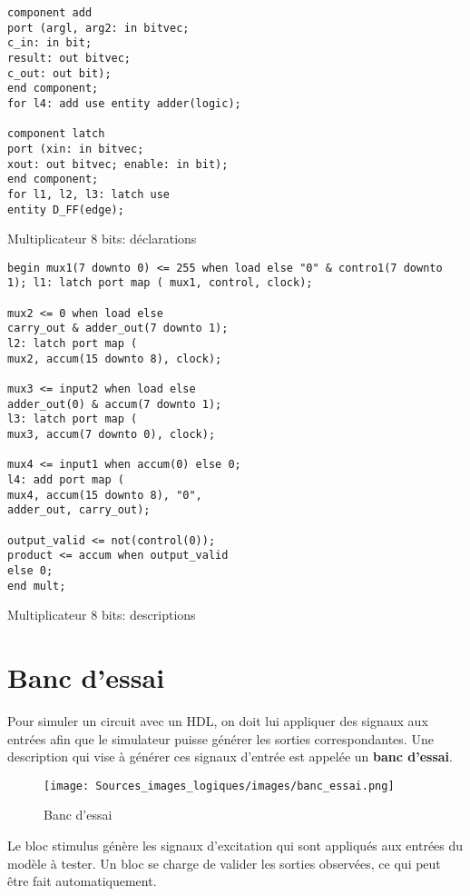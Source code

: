 \documentclass[letter, oneside]{book}
\begin{document}
\begin{enumerate}
\begin{listing}[htbp]
\begin{verbatim}
component add
port (argl, arg2: in bitvec;
c_in: in bit;
result: out bitvec;
c_out: out bit);
end component;
for l4: add use entity adder(logic);

component latch
port (xin: in bitvec;
xout: out bitvec; enable: in bit);
end component;
for l1, l2, l3: latch use
entity D_FF(edge);
\end{verbatim}
\caption{Multiplicateur 8 bits: déclarations}
\end{listing}


\begin{listing}[htbp]
\begin{verbatim}
begin mux1(7 downto 0) <= 255 when load else "0" & contro1(7 downto
1); l1: latch port map ( mux1, control, clock);

mux2 <= 0 when load else
carry_out & adder_out(7 downto 1);
l2: latch port map (
mux2, accum(15 downto 8), clock);

mux3 <= input2 when load else
adder_out(0) & accum(7 downto 1);
l3: latch port map (
mux3, accum(7 downto 0), clock);

mux4 <= input1 when accum(0) else 0;
l4: add port map (
mux4, accum(15 downto 8), "0",
adder_out, carry_out);

output_valid <= not(control(0));
product <= accum when output_valid
else 0;
end mult;
\end{verbatim}
\caption{Multiplicateur 8 bits: descriptions}
\end{listing}
\end{enumerate}


\section{Banc d'essai}
\label{sec:org646fdfe}

Pour simuler un circuit avec un HDL, on doit lui appliquer des signaux
aux entrées afin que le simulateur puisse générer les sorties
correspondantes. Une description qui vise à générer ces signaux
d'entrée est appelée un \textbf{banc d'essai}.


\begin{figure}[htbp]
\centering
\texttt{[image: Sources\_images\_logiques/images/banc\_essai.png]}
\caption{\label{fig:orge38225a}Banc d'essai}
\end{figure}

Le bloc stimulus génère les signaux d'excitation qui sont appliqués
aux entrées du modèle à tester. Un bloc se charge de valider les
sorties observées, ce qui peut être fait automatiquement.
\end{document}

